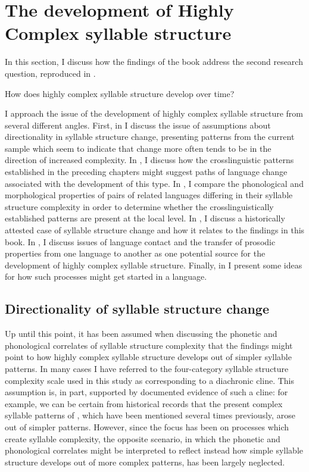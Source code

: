 \section{The development of Highly Complex syllable structure}\label{sec:8.4}

  In this section, I discuss how the findings of the book address the second research question, reproduced in .

\ea\label{ex:8.2}
    {How does highly complex syllable structure develop over time?}
\z

  I approach the issue of the development of highly complex syllable structure from several different angles. First, in  I discuss the issue of assumptions about directionality in syllable structure change, presenting patterns from the current sample which seem to indicate that change more often tends to be in the direction of increased complexity. In , I discuss how the crosslinguistic patterns established in the preceding chapters might suggest paths of language change associated with the development of this type. In , I compare the phonological and morphological properties of pairs of related languages differing in their syllable structure complexity in order to determine whether the crosslinguistically established patterns are present at the local level. In , I discuss a historically attested case of syllable structure change and how it relates to the findings in this book. In , I discuss issues of language contact and the transfer of prosodic properties from one language to another as one potential source for the development of highly complex syllable structure. Finally, in  I present some ideas for how such processes might get started in a language.

\subsection{Directionality of syllable structure change}\label{sec:8.4.1}

  Up until this point, it has been assumed when discussing the phonetic and phonological correlates of syllable structure complexity that the findings might point to how highly complex syllable structure develops out of simpler syllable patterns. In many cases I have referred to the four-category syllable structure complexity scale used in this study as corresponding to a diachronic cline. This assumption is, in part, supported by documented evidence of such a cline: for example, we can be certain from historical records that the present complex syllable patterns of , which have been mentioned several times previously, arose out of simpler patterns. However, since the focus has been on processes which create syllable complexity, the opposite scenario, in which the phonetic and phonological correlates might be interpreted to reflect instead how simple syllable structure develops out of more complex patterns, has been largely neglected.

